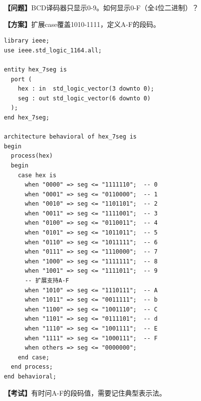 \begin{detailbox}[完整教学]
\textbf{【问题】}BCD译码器只显示0-9。如何显示0-F（全4位二进制）？

\textbf{【方案】}扩展case覆盖1010-1111，定义A-F的段码。

\begin{lstlisting}
library ieee;
use ieee.std_logic_1164.all;

entity hex_7seg is
  port (
    hex : in  std_logic_vector(3 downto 0);
    seg : out std_logic_vector(6 downto 0)
  );
end hex_7seg;

architecture behavioral of hex_7seg is
begin
  process(hex)
  begin
    case hex is
      when "0000" => seg <= "1111110";  -- 0
      when "0001" => seg <= "0110000";  -- 1
      when "0010" => seg <= "1101101";  -- 2
      when "0011" => seg <= "1111001";  -- 3
      when "0100" => seg <= "0110011";  -- 4
      when "0101" => seg <= "1011011";  -- 5
      when "0110" => seg <= "1011111";  -- 6
      when "0111" => seg <= "1110000";  -- 7
      when "1000" => seg <= "1111111";  -- 8
      when "1001" => seg <= "1111011";  -- 9
      -- 扩展支持A-F
      when "1010" => seg <= "1110111";  -- A
      when "1011" => seg <= "0011111";  -- b
      when "1100" => seg <= "1001110";  -- C
      when "1101" => seg <= "0111101";  -- d
      when "1110" => seg <= "1001111";  -- E
      when "1111" => seg <= "1000111";  -- F
      when others => seg <= "0000000";
    end case;
  end process;
end behavioral;
\end{lstlisting}

\textbf{【考试】}有时问A-F的段码值，需要记住典型表示法。
\end{detailbox}

